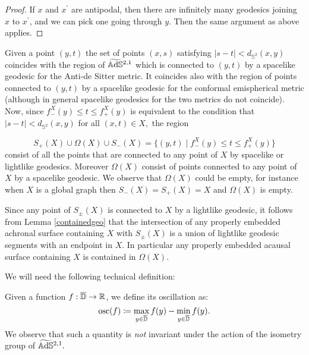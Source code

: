 \begin{proof}
       If $x$ and $x^{\prime}$ are antipodal, then there are infinitely many geodesics joining $x$ to $x^{\prime}$, and we can pick one going through $y$. Then the same argument as above applies. 
\end{proof}

\begin{observation}\label{423}
    Given a point $(y,t)$ the set of points $(x,s)$ satisfying $\lvert s-t \rvert<d_{\mathbb{S}^2}(x,y)$ coincides with the region of $\widetilde{\mathbb{A}\mathrm{d}\mathbb{S}}{}^{2,1}$ which is connected to $(y,t)$ by a spacelike geodesic for the Anti-de Sitter metric. It coincides also with the region of points connected to $(y,t)$ by a spacelike geodesic for the conformal emispherical metric (although in general spacelike geodesics for the two metrics do not coincide). Now, since $f_-^X(y)\leq t\leq f_+^X(y)$ is equivalent to the condition that $\lvert s-t \rvert<d_{\mathbb{S}^2}(x,y)$ for all $(x,t)\in X,$ the region 

    \[
        S_+(X)\cup\Omega(X)\cup S_-(X)=\{(y,t)\;|\; f_-^X(y)\leq t\leq f_+^X(y)\}
    \]
    consist of all the points that are connected to any point of $X$ by spacelike or lightlike geodesics. Moreover $\Omega(X)$ consist of points connected to any point of $X$ by a spacelike geodesic. We observe that $\Omega(X)$ could be empty, for instance when $X$ is a global graph then $S_-(X)=S_+(X)=X$ and $\Omega(X)$ is empty.
\end{observation}

\begin{observation}
    Since any point of $S_\pm(X)$ is connected to $X$ by a lightlike geodesic, it follows from Lemma \ref{containedgeo} that the intersection of any properly embedded achronal surface containing $X$ with $S_\pm(X)$ is a union of lightlike geodesic segments with an endpoint in $X$. In particular any properly embedded acausal surface containing $X$ is contained in $\Omega(X).$
\end{observation}

We will need the following technical definition: 

\begin{definition}
    Given a function $f:\overline{\mathbb{D}}\to\mathbb{R}$, we define its oscillation as: 
    \[
        \text{osc}(f)\coloneqq \max_{y\in\overline{\mathbb{D}}}f(y)-\min_{y\in\overline{\mathbb{D}}}f(y).
    \]
    We observe that such a quantity is \textit{not} invariant under the action of the isometry group of $\widetilde{\mathbb{A}\mathrm{d}\mathbb{S}}{}^{2,1}.$
\end{definition}

